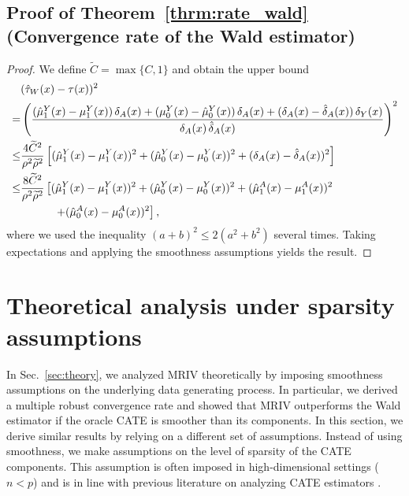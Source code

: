 \documentclass{article} %
\newcommand{\frameworkname}{MRIV\xspace}
\theoremstyle{definition}
\theoremstyle{plain}
\begin{document}
\subsection{Proof of Theorem~\ref*{thrm:rate_wald} (Convergence rate of the Wald estimator)}

\begin{proof}
We define $\widetilde{C} = \max\{C,1\}$ and obtain the upper bound
\begin{align}\label{eq:rate_wald_general}
      &  (\hat{\tau}_W(x) - \tau(x))^2\\ =& \left(\frac{(\hat{\mu}_1^Y(x) - \mu_1^Y(x)) \, \delta_A(x) + (\mu_0^Y(x) - \hat{\mu}_0^Y(x)) \, \delta_A(x) + (\delta_A(x) - \hat{\delta}_A(x)) \, \delta_Y(x)}{\delta_A(x) \, \hat{\delta}_A(x)}\right)^2 \\
         \leq & \frac{4 \widetilde{C}^2}{\rho^2 \widetilde{\rho}^2} \left[(\hat{\mu}_1^Y(x) - \mu_1^Y(x))^2 + (\hat{\mu}_0^Y(x) - \mu_0^Y(x))^2 + (\delta_A(x) - \hat{\delta}_A(x))^2 \right]\\
        \leq & \frac{8 \widetilde{C}^2}{\rho^2 \widetilde{\rho}^2} \left[(\hat{\mu}_1^Y(x) - \mu_1^Y(x))^2 + (\hat{\mu}_0^Y(x) - \mu_0^Y(x))^2 + (\hat{\mu}_1^A(x) - \mu_1^A(x))^2 \right. \notag \\ & \quad \quad  \quad \left.+ (\hat{\mu}_0^A(x) - \mu_0^A(x))^2 \right],
\end{align}
where we used the inequality $(a+b)^2 \leq 2(a^2 + b^2)$ several times.
Taking expectations and applying the smoothness assumptions yields the result.
\end{proof}

\clearpage

\section{Theoretical analysis under sparsity assumptions}\label{app:sparsity}

In Sec.~\ref{sec:theory}, we analyzed \frameworkname theoretically by imposing smoothness assumptions on the underlying data generating process. In particular, we derived a multiple robust convergence rate and showed that \frameworkname outperforms the Wald estimator if the oracle CATE is smoother than its components. In this section, we derive similar results by relying on a different set of assumptions. Instead of using smoothness, we make assumptions on the level of sparsity of the CATE components. This assumption is often imposed in high-dimensional settings ($n < p $) and is in line with previous literature on analyzing CATE estimators \citep{Curth.2021, Kennedy.2022d}.
\end{document}
